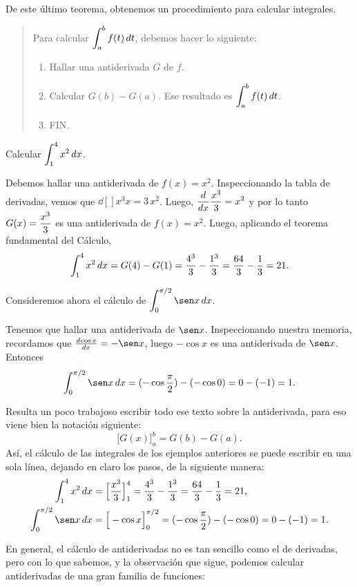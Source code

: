 De este último teorema, obtenemos un procedimiento para calcular integrales.
\begin{quote}
  Para calcular $\displaystyle\int_a^b f(t)\,dt$, debemos hacer lo siguiente:
  \begin{enumerate}
    \item Hallar una antiderivada $G$ de $f$.
    \item Calcular $G(b)-G(a)$. Ese resultado es $\displaystyle\int_a^b f(t)\,dt$.
    \item FIN.
  \end{enumerate}
\end{quote}


\begin{example}
  Calcular $\displaystyle \int_1^4 x^2 \,dx$.

  Debemos hallar una antiderivada de $f(x)=x^2$. Inspeccionando la tabla de derivadas, vemos que $\dd[]{x^3}{x} = 3 \,x^2$. Luego, $\displaystyle\frac{d^{} {}}{d x^{}}\frac{x^3}3 = x^2$ y por lo tanto $G(x)=\displaystyle\frac{x^3}3 $ es una antiderivada de $f(x)=x^2$. Luego, aplicando el teorema fundamental del Cálculo,
  \[
    \int_1^4 x^2 \,dx = G(4) - G(1) = \frac{4^3}3-\frac{1^3}3 = \frac{64}3-\frac13=21.
  \]
\end{example}

\begin{example}
  Consideremos ahora el cálculo de $\D\int_0^{\pi/2} \sen x \dx$.

  Tenemos que hallar una antiderivada de $\sen x$.
  Inspeccionando nuestra memoria, recordamos que $\dd{\cos x}{x}=-\sen x$, luego $-\cos x$ es una antiderivada de $\sen x$. Entonces
  \[
  \int_0^{\pi/2} \sen x\dx = (-\cos \frac\pi2)-(-\cos 0)=0-(-1)=1.
  \]
\end{example}

Resulta un poco trabajoso escribir todo ese texto sobre la antiderivada, para eso viene bien la notación siguiente:
\[
\big[G(x)\big]_a^b = G(b)-G(a).
\]
Así, el cálculo de las integrales de los ejemplos anteriores se puede escribir en una sola línea, dejando en claro los pasos, de la siguiente manera:
\begin{align*}
  \int_1^4 x^2 \dx &= \Big[ \frac{x^3}{3}\Big]_1^4 =\frac{4^3}3-\frac{1^3}3 = \frac{64}3-\frac13=21,
  \\
  \int_0^{\pi/2} \sen x\dx &= \Big[ -\cos x \Big]_{0}^{\pi/2} = (-\cos \frac\pi2)-(-\cos 0)=0-(-1)=1.
\end{align*}

En general, el cálculo de antiderivadas no es tan sencillo como el de derivadas, pero con lo que sabemos, y la observación que sigue, podemos calcular antiderivadas de una gran familia de funciones:

